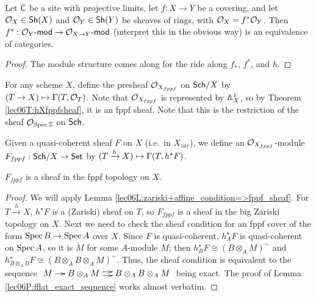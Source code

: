  \begin{corollary}\label{lec07C:descent_modules}
   Let $\C$ be a site with projective limits, let $f:X\to Y$ be a covering, and let
   $\O_X\in \sh(X)$ and $\O_Y\in \sh(Y)$ be sheaves of rings, with $\O_X=f^*\O_Y$. Then
   $f^*:\O_Y\mod\to \O_{X\to Y}\mod$ (interpret this in the obvious way) is an
   equivalence of categories.
 \end{corollary}
 \begin{proof}
   The module structure comes along for the ride along $f_*$, $f^*$, and $h$.
 \end{proof}

 For any scheme $X$, define the presheaf $\O_{X_{fppf}}$ on $\sch/X$ by $(T\to X)\mapsto
 \Ga(T,\O_T)$. Note that $\O_{X_{fppf}}$ is represented by $\AA^1_X$, so by Theorem
 \ref{lec06T:hXfppfsheaf}, it is an fppf sheaf. Note that this is the restriction of the
 sheaf $\O_{\spec\ZZ}$ on $\sch$.

 Given a quasi-coherent sheaf $F$ on $X$ (i.e.~in $X_{zar}$), we define an
 $\O_{X_{fppf}}$-module $F_{fppf}:\sch/X \to \set$ by $(T\xrightarrow{h} X)\mapsto
 \Ga(T,h^\star F)$.
 \begin{lemma}\label{lec07L:F^F_is_fppf_sheaf}
   $F_{fppf}$ is a sheaf in the fppf topology on $X$.
 \end{lemma}
 \begin{proof}
   We will apply Lemma \ref{lec06L:zariski+affine_condition=>fppf_sheaf}. For
   $T\xrightarrow h X$, $h^\star F$ is a (Zariski) sheaf on $T$, so $F_{fppf}$ is a sheaf
   in the big Zariski topology on $X$. Next we need to check the sheaf condition for an
   fppf cover of the form $\spec B \to \spec A$ over $X$. Since $F$ is quasi-coherent,
   $h_A^\star F$ is quasi-coherent on $\spec A$, so it is $\tilde M$ for some $A$-module
   $M$; then $h_B^\star F \cong (B\otimes_A M)^\sim$ and $h^\star_{B\otimes_A B} F \cong
   (B\otimes_A B\otimes_A M)^\sim$. Thus, the sheaf condition is equivalent to the
   sequence $\xymatrix@-1pc{M\ar[r] & B\otimes_A M \ar@<.5ex>[r]\ar@<-.5ex>[r] &
   B\otimes_A B\otimes_A M}$ being exact. The proof of Lemma
   \ref{lec06P:fflat_exact_sequence} works almost verbatim.
 \end{proof}

